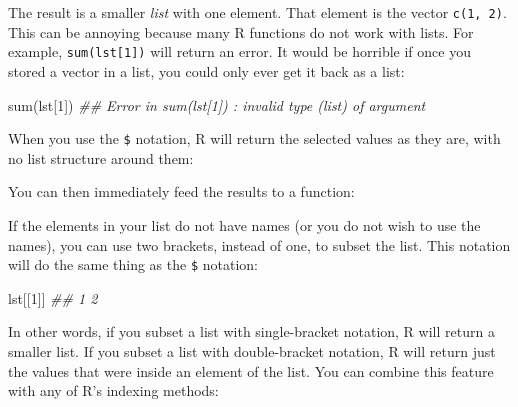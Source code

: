 \documentclass[
  letterpaper,
  DIV=11,
  numbers=noendperiod]{scrbook}
\newenvironment{Shaded}{\begin{snugshade}}{\end{snugshade}}
\newcommand{\DecValTok}[1]{\textcolor[rgb]{0.68,0.00,0.00}{#1}}
\newcommand{\DocumentationTok}[1]{\textcolor[rgb]{0.37,0.37,0.37}{\textit{#1}}}
\newcommand{\FunctionTok}[1]{\textcolor[rgb]{0.28,0.35,0.67}{#1}}
\newcommand{\NormalTok}[1]{\textcolor[rgb]{0.00,0.23,0.31}{#1}}
\newcommand{\SpecialCharTok}[1]{\textcolor[rgb]{0.37,0.37,0.37}{#1}}
\begin{document}
The result is a smaller \emph{list} with one element. That element is
the vector \texttt{c(1,\ 2)}. This can be annoying because many R
functions do not work with lists. For example, \texttt{sum(lst{[}1{]})}
will return an error. It would be horrible if once you stored a vector
in a list, you could only ever get it back as a list:

\begin{Shaded}
\begin{Highlighting}[]
\FunctionTok{sum}\NormalTok{(lst[}\DecValTok{1}\NormalTok{])}
\DocumentationTok{\#\# Error in sum(lst[1]) : invalid \textquotesingle{}type\textquotesingle{} (list) of argument}
\end{Highlighting}
\end{Shaded}

When you use the \texttt{\$} notation, R will return the selected values
as they are, with no list structure around them:

\begin{Shaded}
\end{Shaded}

You can then immediately feed the results to a function:

\begin{Shaded}
\end{Shaded}

If the elements in your list do not have names (or you do not wish to
use the names), you can use two brackets, instead of one, to subset the
list. This notation will do the same thing as the \texttt{\$} notation:

\begin{Shaded}
\begin{Highlighting}[]
\NormalTok{lst[[}\DecValTok{1}\NormalTok{]]}
\DocumentationTok{\#\# 1 2}
\end{Highlighting}
\end{Shaded}

In other words, if you subset a list with single-bracket notation, R
will return a smaller list. If you subset a list with double-bracket
notation, R will return just the values that were inside an element of
the list. You can combine this feature with any of R's indexing methods:
\end{document}
